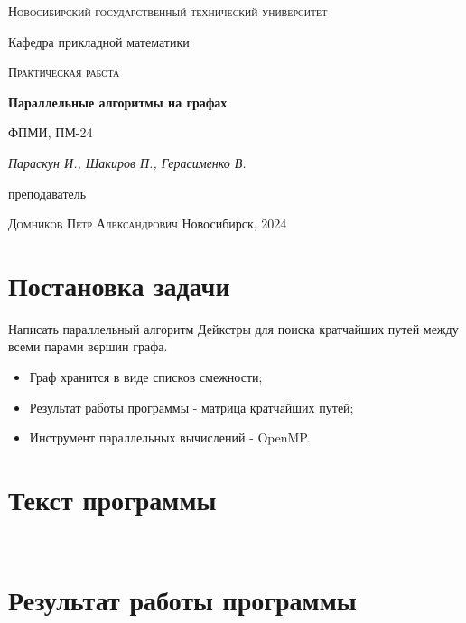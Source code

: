 \documentclass[12pt, a4paper]{article}
\begin{document}
\begin{titlepage}
  \centering
  \textsc{Новосибирский государственный технический университет}\par
  \vspace{1mm}
  Кафедра прикладной математики\par
  \vspace{4cm}
  \textsc{Практическая работа }\par
  {\huge\bfseries Параллельные алгоритмы на графах\par}
  \vspace{1cm}
  {\scriptsize ФПМИ, ПМ-24\par}
  \vspace{1mm}
  {\itshape\large Параскун И., Шакиров П., Герасименко В.\par}
  \vfill
  {\small преподаватель\par}
  \vspace{1mm}
  \textsc{Домников Петр Александрович}
  \vfill
  \large{Новосибирск, 2024}
\end{titlepage}

\newpage
\setcounter{page}{2}

\section{Постановка задачи}
Написать параллельный алгоритм Дейкстры для поиска кратчайших путей между всеми парами вершин графа.
\begin{itemize}
  \item Граф хранится в виде списков смежности;
  \item Результат работы программы - матрица кратчайших путей;
  \item Инструмент параллельных вычислений - OpenMP.
\end{itemize}

\section{Текст программы}

\inputminted[firstline=7, lastline=32]{c}{/home/mehandes/c/src/github.com/meha4j/math/bgs/dcg/include/bgs/dcg.h}
\inputminted[firstline=61, lastline=172]{c}{/home/mehandes/c/src/github.com/meha4j/math/bgs/dcg/src/dcg.c}

\section{Результат работы программы}
\end{document}
